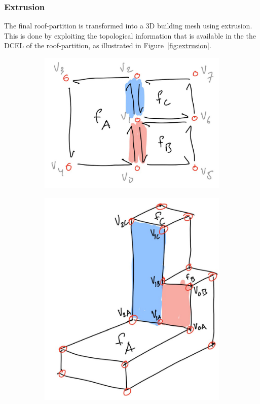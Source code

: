 \subsubsection{Extrusion}
\label{sec:extrusion}
The final roof-partition is transformed into a 3D building mesh using extrusion.
This is done by exploiting the topological information that is available in the the DCEL of the roof-partition, as illustrated in Figure~\ref{fig:extrusion}.
\begin{figure}
	\centering
	\begin{subfigure}[b]{0.45\linewidth}
		\includegraphics[width=\linewidth]{figs/2DDCEL.pdf}
		\caption{}%
		\label{subfig:2ddcel}
	\end{subfigure}
	\quad
	\begin{subfigure}[b]{0.45\linewidth}
		\includegraphics[width=\linewidth]{figs/3DDCEL.pdf}

\end{subfigure}
\end{figure}
